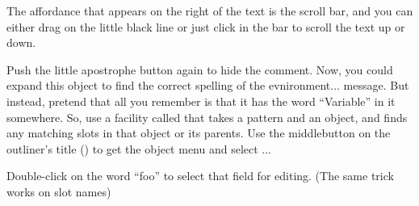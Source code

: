 \documentclass[letterpaper,10pt,english]{sphinxmanual}
\begin{document}
The affordance that appears on the right of the text is the scroll bar, and you can either drag on the
little black line or just click in the bar to scroll the text up or down.

Push the little apostrophe button again to hide the comment. Now, you could expand this object to
find the correct spelling of the evnironment... message. But instead, pretend that all you remember
is that it has the word “Variable” in it somewhere. So, use a facility called  that takes
a pattern and an object, and finds any matching slots in that object or its parents. Use the middlebutton
on the outliner’s title () to get the object menu and select ...
\begin{figure}[htbp]\begin{flushleft}

\end{flushleft}\end{figure}

Double-click on the word “foo” to select that field for editing. (The same trick works on slot
names)
\begin{figure}[htbp]\begin{flushleft}

\end{flushleft}\end{figure}
\end{document}
